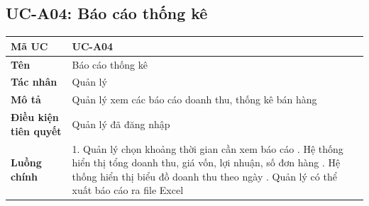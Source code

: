 \documentclass[../20232006p.tex]{subfiles}
\begin{document}
\subsection{UC-A04: Báo cáo thống kê}
\begin{table}[H]
    \centering
    \begin{tabular}{|p{3.5cm}|p{10cm}|}
        \hline
        \textbf{Mã UC}                & UC-A04                                               \\
        \hline
        \textbf{Tên}                  & Báo cáo thống kê                                     \\
        \hline
        \textbf{Tác nhân}             & Quản lý                                              \\
        \hline
        \textbf{Mô tả}                & Quản lý xem các báo cáo doanh thu, thống kê bán hàng \\
        \hline
        \textbf{Điều kiện tiên quyết} & Quản lý đã đăng nhập                                 \\
        \hline
        \textbf{Luồng chính}          &
        1. Quản lý chọn khoảng thời gian cần xem báo cáo \newline
        2. Hệ thống hiển thị tổng doanh thu, giá vốn, lợi nhuận, số đơn hàng \newline
        3. Hệ thống hiển thị biểu đồ doanh thu theo ngày \newline
        4. Quản lý có thể xuất báo cáo ra file Excel                                         \\
        \hline
    \end{tabular}
\end{table}
\end{document}
